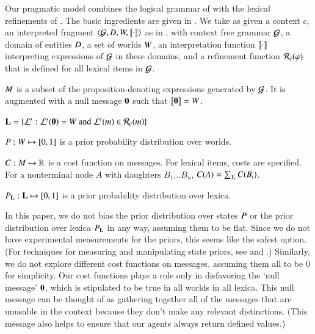 \documentclass[leqno,12pt]{article}
\begin{document}
Our pragmatic model combines the logical grammar of
 with the lexical refinements of
. The basic ingredients are given in
. We take as given a context $c$, an interpreted
fragment $\langle \mathcal{G}, D, W, \llbracket\cdot\rrbracket \rangle$ as in
, with context free grammar $\mathcal{G}$, a domain
of entities $D$, a set of worlds $W$, an interpretation
function $\llbracket\cdot\rrbracket$ interpreting expressions of $\mathcal{G}$ in these
domains, and a refinement function $\mathcal{R}_{c}(\varphi)$ that is defined
for all lexical items in $\mathcal{G}$.
%
\begin{examples}
\item\label{modobjects}
  \begin{examples}
  \item\label{messages} $M$ is a subset of the
    proposition-denoting expressions generated by $\mathcal{G}$. It is
    augmented with a null message $\mathbf{0}$ such that
    $\llbracket\mathbf{0}\rrbracket = W$.

  \item\label{lexset}%
    $\mathbf{L} = \left\{ \mathcal{L}' :  \mathcal{L}'(\mathbf{0}) = W \text{ and } \mathcal{L}'(m) \in \mathcal{R}_{c}(m) \right\}$             
  
  \item $P : W \mapsto [0,1]$ is a prior probability
    distribution over worlds.

  \item $C : M \mapsto \mathbb{R}$ is a cost function on
    messages.  For lexical items, costs are specified. For a
    nonterminal node $A$ with daughters $B_{1} \ldots B_{n}$,
    $C(A) = \sum_{Y_{i}}C(B_{i})$.

  \item $P_{\mathbf{L}} : \mathbf{L} \mapsto [0,1]$ is a prior probability
    distribution over lexica.
  \end{examples}
\end{examples}

In this paper, we do not bias the prior distribution over states
$P$ or the prior distribution over lexica $P_{\mathbf{L}}$ in any
way, assuming them to be flat. Since we do not have experimental
measurements for the priors, this seems like the safest option. (For
techniques for measuring and manipulating state priors, see
\citealt{Frank:Goodman:2012} and
\citealt{Stiller:Goodman:Frank:2011}.)  Similarly, we do not explore
different cost functions on messages, assuming them all to be $0$ for
simplicity. Our cost functions plays a role only in disfavoring the
`null message' $\mathbf{0}$, which is stipulated to be true in all
worlds in all lexica. This null message can be thought of as gathering
together all of the messages that are unusable in the context because
they don't make any relevant distinctions. (This message also helps to
ensure that our agents always return defined values.)
\end{document}

